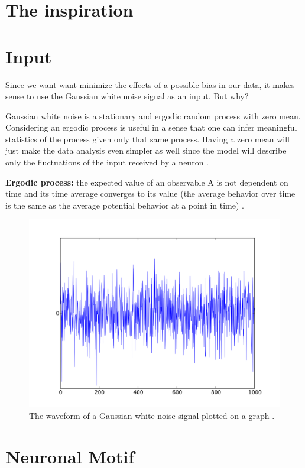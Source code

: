\documentclass[class={myRUCProject}, crop=false]{standalone}
\begin{document}
\section{The inspiration}

\section{Input}
\indent Since we want want minimize the effects of a possible bias in our data, it makes sense to use the Gaussian white noise signal as an input. But why? \newline

\indent Gaussian white noise is a stationary and ergodic random process with zero mean. Considering an ergodic process is useful in a sense that one can infer meaningful statistics of the process given only that same process. Having a zero mean will just make the data analysis even simpler as well since the model will describe  only the fluctuations of the input received by a neuron \cite{}.

\textbf{Ergodic process:} the expected value of an observable A is not dependent on time and its time average converges to its value (the average behavior over time is the same as the average potential behavior at a point in time) \cite{}.

\begin{figure}[h]
    \centering
    \includegraphics[width=300 pt]{Pictures/Ana/White_noise.svg.png}
    \caption{The waveform of a Gaussian white noise signal plotted on a graph .} \label{fig:unkown}
\end{figure}

\section{Neuronal Motif}
\end{document}
